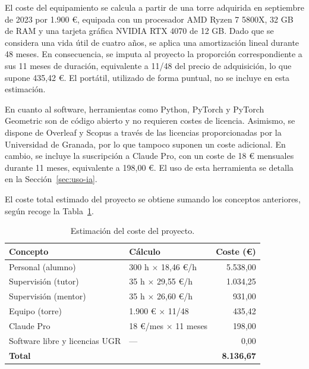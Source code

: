 El coste del equipamiento se calcula a partir de una torre adquirida en septiembre de 2023 por 1.900 \euro{}, equipada con un procesador AMD Ryzen 7 5800X, 32 GB de RAM y una tarjeta gráfica NVIDIA RTX 4070 de 12 GB. Dado que se considera una vida útil de cuatro años, se aplica una amortización lineal durante 48 meses. En consecuencia, se imputa al proyecto la proporción correspondiente a sus 11 meses de duración, equivalente a 11/48 del precio de adquisición, lo que supone 435{,}42 \euro{}. El portátil, utilizado de forma puntual, no se incluye en esta estimación.

En cuanto al software, herramientas como Python, PyTorch y PyTorch Geometric son de código abierto y no requieren costes de licencia. Asimismo, se dispone de Overleaf y Scopus a través de las licencias proporcionadas por la Universidad de Granada, por lo que tampoco suponen un coste adicional. En cambio, se incluye la suscripción a Claude Pro, con un coste de 18 \euro{} mensuales durante 11 meses, equivalente a 198{,}00 \euro{}. El uso de esta herramienta se detalla en la Sección~\ref{sec:uso-ia}.

El coste total estimado del proyecto se obtiene sumando los conceptos anteriores, según recoge la Tabla~\ref{tab:costes}.

\begin{table}[htbp]
    \centering
    \begin{tabular}{l l r}
        \hline
        \textbf{Concepto} & \textbf{Cálculo} & \textbf{Coste (\euro{})} \\
        \hline 
        Personal (alumno) & 300 h $\times$ 18{,}46 \euro{}/h & 5.538{,}00 \\
        Supervisión (tutor) & 35 h $\times$ 29{,}55 \euro{}/h & 1.034{,}25 \\
        Supervisión (mentor) & 35 h $\times$ 26{,}60 \euro{}/h & 931{,}00 \\
        Equipo (torre) & 1.900 \euro{} $\times$ 11/48 & 435{,}42 \\
        Claude Pro & 18 \euro{}/mes $\times$ 11 meses & 198{,}00 \\
        Software libre y licencias UGR & --- & 0{,}00 \\
        \hline
        \textbf{Total} & & \textbf{8.136{,}67} \\
        \hline
    \end{tabular}
    \caption{Estimación del coste del proyecto.}
    \label{tab:costes}
\end{table}

